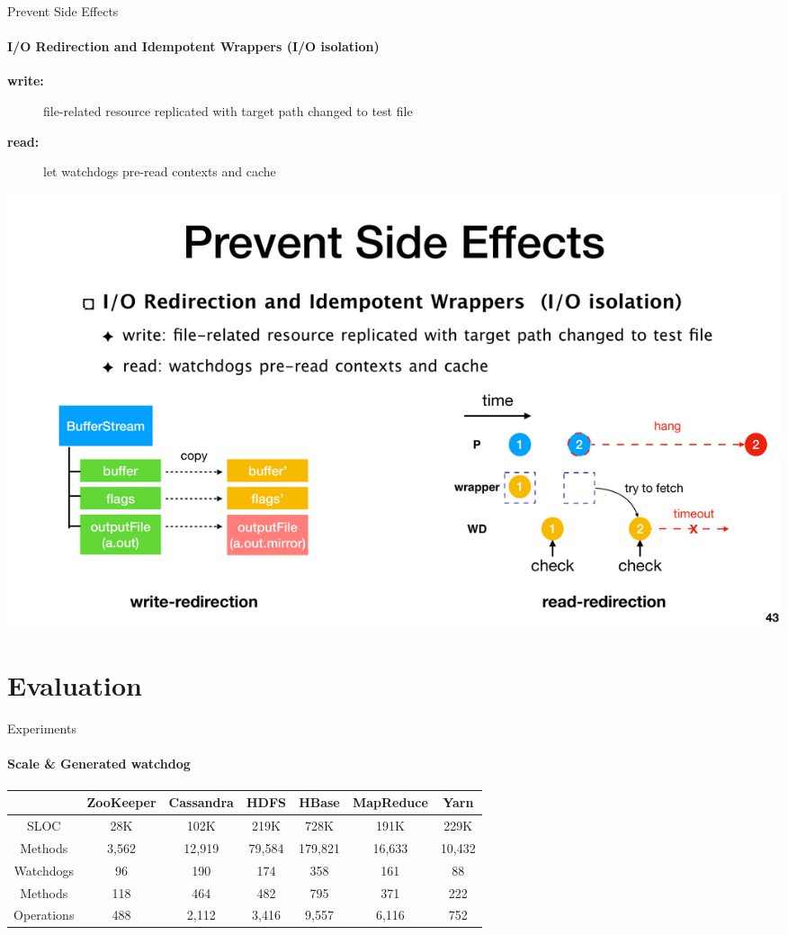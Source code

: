 \documentclass[aspectratio=169]{beamer}
\begin{document}
\begin{frame}{Prevent Side Effects}
    \framesubtitle{I/O Redirection and Idempotent Wrappers (I/O isolation)}
    \begin{description}
        \item[\textbf{write:}] file-related resource replicated with target path changed to test file
        \item[\textbf{read:}] let watchdogs pre-read contexts and cache  
    \end{description}

    \begin{center}
        \includegraphics[width=.9\textwidth]{fig/io}
    \end{center}
\end{frame}
\section{Evaluation}
\begin{frame}{Experiments}
    \framesubtitle{Scale \& Generated watchdog}
    \begin{tabular}{c|c|c|c|c|c|c}
        \toprule
        & ZooKeeper & Cassandra & HDFS &  HBase & MapReduce & Yarn \\
        \midrule
SLOC & 28K & 102K & 219K & 728K & 191K & 229K \\
Methods & 3,562 & 12,919 & 79,584 & 179,821 & 16,633 & 10,432 \\
\midrule
Watchdogs & 96 & 190 & 174 & 358 & 161 & 88 \\
Methods & 118 & 464 & 482 & 795 & 371 & 222 \\
Operations & 488 & 2,112 & 3,416 & 9,557 & 6,116 & 752 \\
\bottomrule
    \end{tabular}
\end{frame}
\end{document}
